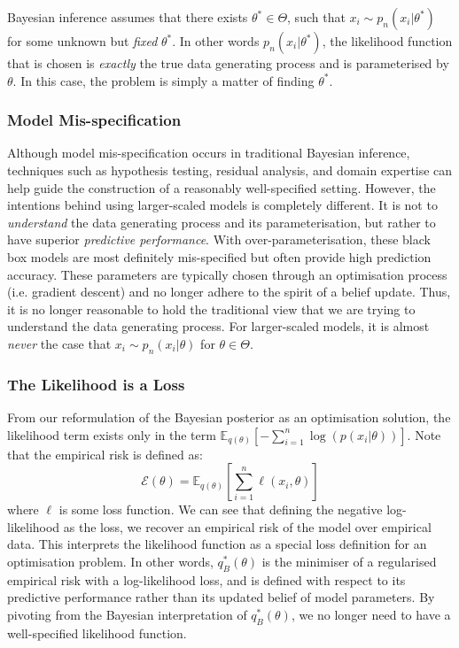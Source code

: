 \documentclass[twoside,11pt]{article}
\begin{document}
Bayesian inference assumes that there exists $\theta^* \in \Theta$, such that $x_i \sim p_n(x_i | \theta^*)$ for some unknown but \textit{
fixed} $\theta^*$. In other words $p_n(x_i | \theta^*)$, the likelihood function that is chosen is \textit{exactly} the true data generating process and is parameterised by $\theta$. In this case, the problem is simply a matter of finding $\theta^*$. 
\subsubsection{Model Mis-specification}
Although model mis-specification occurs in traditional Bayesian inference, techniques such as hypothesis testing, residual analysis, and domain expertise can help guide the construction of a reasonably well-specified setting. However, the intentions behind using larger-scaled models is completely different. It is not to \textit{understand} the data generating process and its parameterisation, but rather to have superior \textit{predictive performance}. With over-parameterisation, these black box models are most definitely mis-specified but often provide high prediction accuracy. These parameters are typically chosen through an optimisation process (i.e. gradient descent) and no longer adhere to the spirit of a belief update. Thus, it is no longer reasonable to hold the traditional view that we are trying to understand the data generating process. For larger-scaled models, it is almost \textit{never} the case that $x_i \sim p_n(x_i|\theta)$ for  $\theta \in \Theta$.
\subsubsection{The Likelihood is a Loss}
From our reformulation of the Bayesian posterior as an optimisation solution, the likelihood term exists only in the term $\mathbb{E}_{q(\theta)}\left[-\sum_{i=1}^n \log\left(p(x_i|\theta)\right)\right]$. Note that the empirical risk is defined as:
\[\mathcal{E}(\theta) = \mathbb{E}_{q(\theta)}\left[\sum_{i=1}^n \ell\left(x_i, \theta\right)\right]\]
where $\ell$ is some loss function. We can see that defining the negative log-likelihood as the loss, we recover an empirical risk of the model over empirical data. This interprets the likelihood function as a special loss definition for an optimisation problem. In other words, $q_B^*(\theta)$ is the minimiser of a regularised empirical risk with a log-likelihood loss, and is defined with respect to its predictive performance rather than its updated belief of model parameters. By pivoting from the Bayesian interpretation of $q_B^*(\theta)$, we no longer need to have a well-specified likelihood function.
\end{document}
